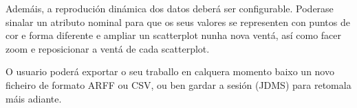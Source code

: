 Ademáis, a reprodución dinámica dos datos deberá ser configurable. Poderase sinalar un atributo nominal para que os seus valores se representen con puntos de cor e forma diferente e ampliar un scatterplot nunha nova ventá, así como facer zoom e reposicionar a ventá de cada scatterplot. 

O usuario poderá exportar o seu traballo en calquera momento baixo un novo ficheiro de formato ARFF ou CSV, ou ben gardar a sesión (JDMS) para retomala máis adiante. 
